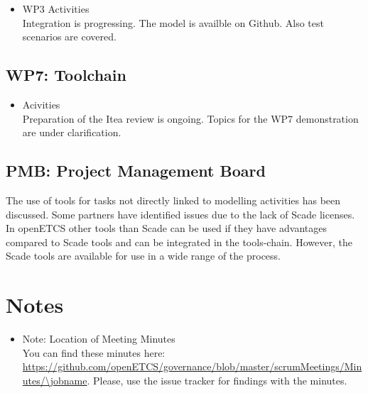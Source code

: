 \documentclass[a4paper, 11pt]{article}
\begin{document}
\begin{itemize}
\item WP3 Activities\\
Integration is progressing. The model is availble on Github. Also test scenarios are covered.

\end{itemize}

\subsection{WP7: Toolchain}

\begin{itemize}
\item Acivities\\
Preparation of the Itea review is ongoing. Topics for the WP7 demonstration are under clarification.
\end{itemize}

\subsection{PMB: Project Management Board}

The use of tools for tasks not directly linked to modelling activities has been discussed. Some partners have identified issues due to the lack of Scade licenses. 
In openETCS other tools than Scade can be used if they have advantages compared to Scade tools and can be integrated in the tools-chain. However, the Scade tools are available for use in a wide range of the process.

\section{Notes}
\begin{itemize}

\item Note: Location of Meeting Minutes\\
You can find these minutes here: \url{https://github.com/openETCS/governance/blob/master/scrumMeetings/Minutes/\jobname}. Please, use the issue tracker for findings with the minutes.

\end{itemize}
\end{document}
